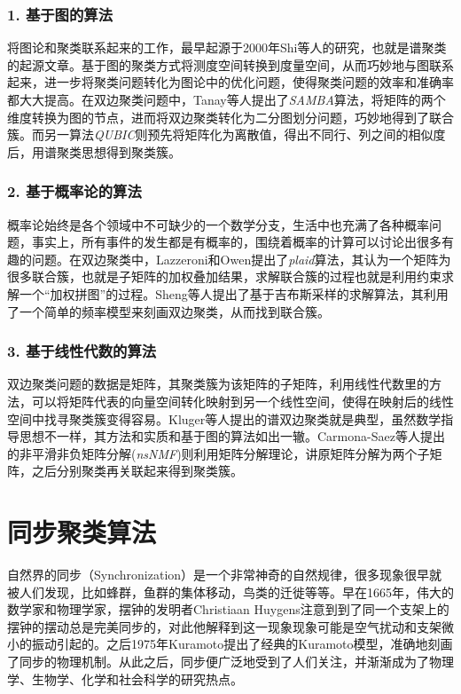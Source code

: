 \subsubsection*{1. 基于图的算法}
将图论和聚类联系起来的工作，最早起源于2000年Shi等人\cite{shi2000normalized}的研究，也就是谱聚类的起源文章。基于图的聚类方式将测度空间转换到度量空间，从而巧妙地与图联系起来，进一步将聚类问题转化为图论中的优化问题，使得聚类问题的效率和准确率都大大提高。在双边聚类问题中，Tanay等人\cite{tanay2002discovering}提出了\emph{SAMBA}算法，将矩阵的两个维度转换为图的节点，进而将双边聚类转化为二分图划分问题，巧妙地得到了联合簇。而另一算法\emph{QUBIC}\cite{li2009qubic}则预先将矩阵化为离散值，得出不同行、列之间的相似度后，用谱聚类思想得到聚类簇。

\subsubsection*{2. 基于概率论的算法}
概率论始终是各个领域中不可缺少的一个数学分支，生活中也充满了各种概率问题，事实上，所有事件的发生都是有概率的，围绕着概率的计算可以讨论出很多有趣的问题。在双边聚类中，Lazzeroni和Owen\cite{lazzeroni2002plaid}提出了\emph{plaid}算法，其认为一个矩阵为很多联合簇，也就是子矩阵的加权叠加结果，求解联合簇的过程也就是利用约束求解一个“加权拼图”的过程。Sheng等人\cite{sheng2003biclustering}提出了基于吉布斯采样的求解算法，其利用了一个简单的频率模型来刻画双边聚类，从而找到联合簇。

\subsubsection*{3. 基于线性代数的算法}
双边聚类问题的数据是矩阵，其聚类簇为该矩阵的子矩阵，利用线性代数里的方法，可以将矩阵代表的向量空间转化映射到另一个线性空间，使得在映射后的线性空间中找寻聚类簇变得容易。Kluger等人\cite{kluger2003spectral}提出的谱双边聚类就是典型，虽然数学指导思想不一样，其方法和实质和基于图的算法如出一辙。Carmona-Saez等人\cite{carmona2006biclustering}提出的非平滑非负矩阵分解(\emph{nsNMF})则利用矩阵分解理论，讲原矩阵分解为两个子矩阵，之后分别聚类再关联起来得到聚类簇。


\section{同步聚类\Sync{}算法}
\label{sec:sync}
自然界的同步（Synchronization）是一个非常神奇的自然规律，很多现象很早就被人们发现，比如蜂群，鱼群的集体移动，鸟类的迁徙等等\cite{frisch1994social}。早在1665年，伟大的数学家和物理学家，摆钟的发明者Christiaan Huygens\cite{huygens1966horologium}注意到到了同一个支架上的摆钟的摆动总是完美同步的，对此他解释到这一现象现象可能是空气扰动和支架微小的振动引起的。之后1975年Kuramoto\cite{kuramoto2012chemical}提出了经典的Kuramoto模型，准确地刻画了同步的物理机制。从此之后，同步便广泛地受到了人们关注，并渐渐成为了物理学、生物学、化学和社会科学的研究热点。

